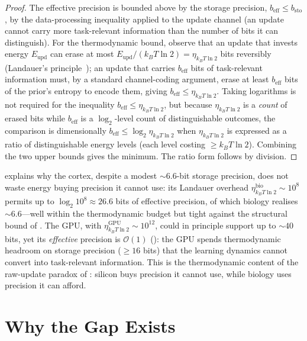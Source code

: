 \documentclass[11pt]{article}
\theoremstyle{definition}
\theoremstyle{remark}
\newcommand{\Land}{k_{\!B}T\ln 2}
\begin{document}
\begin{proof}
The effective precision is bounded above by the storage precision,
$b_{\mathrm{eff}}\le b_{\mathrm{sto}}$, by the data-processing
inequality applied to the update channel (an update cannot carry
more task-relevant information than the number of bits it can
distinguish).  For the thermodynamic bound, observe that an update
that invests energy $E_{\mathrm{upd}}$ can erase at most
$E_{\mathrm{upd}}/(k_{B}T\ln 2)=\eta_{\Land}$ bits reversibly
(Landauer's principle~\cite{landauer1961irreversibility}); an update
that carries $b_{\mathrm{eff}}$ bits of task-relevant information
must, by a standard channel-coding argument, erase at least
$b_{\mathrm{eff}}$ bits of the prior's entropy to encode them,
giving $b_{\mathrm{eff}}\le\eta_{\Land}$.  Taking logarithms is not
required for the inequality $b_{\mathrm{eff}}\le\eta_{\Land}$, but
because $\eta_{\Land}$ is a \emph{count} of erased bits while
$b_{\mathrm{eff}}$ is a $\log_{2}$-level count of distinguishable
outcomes, the comparison is dimensionally
$b_{\mathrm{eff}}\le\log_{2}\eta_{\Land}$ when $\eta_{\Land}$ is
expressed as a ratio of distinguishable energy levels (each level
costing $\ge k_{B}T\ln 2$).  Combining the two upper bounds gives
the minimum.  The ratio form follows by division.
\end{proof}

 explains why the cortex, despite a
modest $\sim\!6.6$-bit storage precision, does not waste energy
buying precision it cannot use: its Landauer overhead
$\eta_{\Land}^{\mathrm{bio}}\sim 10^{8}$ permits up to
$\log_{2}10^{8}\approx 26.6$ bits of effective precision, of which
biology realises $\sim\!6.6$---well within the thermodynamic budget
but tight against the structural bound of
.  The GPU, with
$\eta_{\Land}^{\mathrm{GPU}}\sim 10^{12}$, could in principle
support up to $\sim\!40$ bits, yet its \emph{effective} precision is
$\mathcal{O}(1)$ (): the GPU spends
thermodynamic headroom on storage precision ($\ge 16$ bits) that the
learning dynamics cannot convert into task-relevant information.
This is the thermodynamic content of the raw-update paradox of
: silicon buys precision it cannot use, while
biology uses precision it can afford.

\section{Why the Gap Exists}
\label{sec:why}
\end{document}
